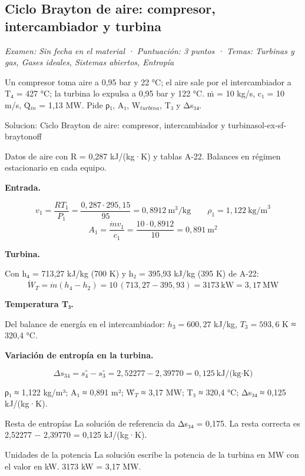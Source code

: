\documentclass[11pt,a4paper]{article}
\begin{document}
\subsection{Ciclo Brayton de aire: compresor, intercambiador y turbina}
\noindent\textit{Examen: Sin fecha en el material · Puntuación: 3 puntos · Temas: Turbinas y gas, Gases ideales, Sistemas abiertos, Entropía}\par\medskip

Un compresor toma aire a 0,95 bar y 22 °C; el aire sale por el intercambiador a T₄ = 427 °C; la turbina lo expulsa a 0,95 bar y 122 °C. ṁ = 10 kg/s, c₁ = 10 m/s, Q̇$_{in}$ = 1,13 MW. Pide ρ₁, A₁, W$_{turbina}$, T₃ y Δs₃₄.

\begin{ocg}{Solucion: Ciclo Brayton de aire: compresor, intercambiador y turbina}{sol-ex-sf-brayton}{off}
\begin{antesbox}
Datos de aire con R = 0,287 kJ/(kg·K) y tablas A-22. Balances en régimen estacionario en cada equipo.
\end{antesbox}

\par\medskip\noindent\textbf{Entrada.}\par
\[v_1 = \frac{RT_1}{P_1} = \frac{0{,}287\cdot 295{,}15}{95} = 0{,}8912\ \text{m}^3/\text{kg} \qquad \rho_1 = 1{,}122\ \text{kg/m}^3\]   \[A_1 = \frac{\dot m v_1}{c_1} = \frac{10\cdot 0{,}8912}{10} = 0{,}891\ \text{m}^2\]

\par\medskip\noindent\textbf{Turbina.}\par
Con h₄ = 713,27 kJ/kg (700 K) y h₂ = 395,93 kJ/kg (395 K) de A-22:  \[\dot W_T = \dot m(h_4 - h_2) = 10\,(713{,}27 - 395{,}93) = 3173\ \text{kW} = 3{,}17\ \text{MW}\]

\par\medskip\noindent\textbf{Temperatura T₃.}\par
Del balance de energía en el intercambiador:  $h_3 = 600{,}27$  kJ/kg,  $T_3 = 593{,}6$  K ≈ 320,4 °C.

\par\medskip\noindent\textbf{Variación de entropía en la turbina.}\par
\[\Delta s_{34} = s^\circ_4 - s^\circ_3 = 2{,}52277 - 2{,}39770 = 0{,}125\ \text{kJ/(kg·K)}\]

\begin{resbox}
ρ₁ ≈ 1,122 kg/m³; A₁ ≈ 0,891 m²; Ẇ$_{T}$ ≈ 3,17 MW; T₃ ≈ 320,4 °C; Δs₃₄ ≈ 0,125 kJ/(kg·K).
\end{resbox}

\begin{ojobox}{Resta de entropías}
La solución de referencia da Δs₃₄ = 0,175. La resta correcta es 2,52277 − 2,39770 = 0,125 kJ/(kg·K).
\end{ojobox}

\begin{ojobox}{Unidades de la potencia}
La solución escribe la potencia de la turbina en MW con el valor en kW. 3173 kW = 3,17 MW.
\end{ojobox}

\hspace{0pt}\end{ocg}
\end{document}
